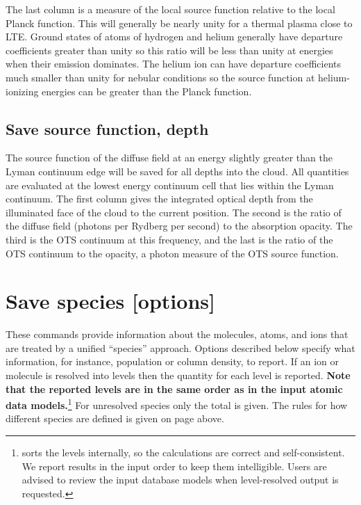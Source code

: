 The last column is a measure of the local source function relative to
the local Planck function.
This will generally be nearly unity for a thermal
plasma close to LTE.
Ground states of atoms of hydrogen and helium generally
have departure coefficients greater than unity so this ratio will be less
than unity at energies when their emission dominates.  The helium ion can
have departure coefficients much smaller than unity for nebular conditions
so the source function at helium-ionizing energies can be greater than the
Planck function.

\subsection{Save source function, depth}

The source function of the diffuse field at an energy slightly greater
than the Lyman continuum edge will be saved for all depths into the cloud.
All quantities are evaluated at the lowest energy continuum cell that lies
within the Lyman continuum.  The first column gives the integrated optical
depth from the illuminated face of the cloud to the current position.  The
second is the ratio of the diffuse field (photons per Rydberg per second)
to the absorption opacity.  The third is the OTS continuum at this frequency,
and the last is the ratio of the OTS continuum to the opacity, a photon
measure of the OTS source function.

\section{Save species [options]}
\label{sec:SaveSpecies}

These commands provide information about the molecules, atoms, and ions that are
treated by a unified ``species'' approach.
Options described below specify what information, for instance,
population or column density, to report.
If an ion or molecule is resolved into levels then the quantity for each
level is reported.
\textbf{Note that the reported levels are in the same order as in the input
atomic data models.}\footnote{\Cloudy{} sorts the levels internally, so the
calculations are correct and self-consistent.
We report results in the input order to keep them intelligible.
Users are advised to review the input database models when level-resolved output
is requested.}
For unresolved species only the total is given.
The rules for how different species are defined is given on 
page \pageref{sec:SpeciesDefine} above.

